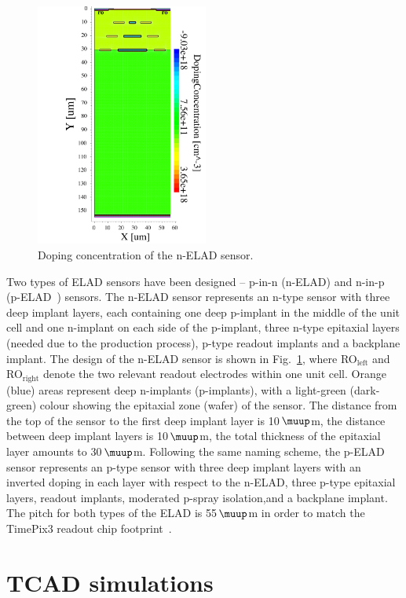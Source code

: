 \documentclass[a4paper,11pt]{article}
\begin{document}
\begin{figure}[t]
  \centering
  \includegraphics[height=8cm]{figures/nelad2.pdf}
  \caption{Doping concentration of the n-ELAD sensor.}
  \label{fig:geom}
\end{figure}

Two types of ELAD sensors have been designed -- p-in-n (n-ELAD) and n-in-p (p-ELAD~\cite{elad}) sensors.
The n-ELAD sensor represents an n-type sensor with three deep implant layers, each containing one deep p-implant in the middle of the unit cell and one n-implant on each side of the p-implant,
 three n-type epitaxial layers (needed due to the production process), p-type readout implants and a backplane implant.
The design of the n-ELAD sensor is shown in Fig.~\ref{fig:geom}, where RO$_{\textrm{left}}$ and RO$_{\textrm{right}}$ denote the two relevant readout electrodes within one unit cell.
Orange (blue) areas represent deep n-implants (p-implants), with a light-green (dark-green) colour showing the epitaxial zone (wafer) of the sensor. 
The distance from the top of the sensor to the first deep implant layer is 10\,$\muup$m, the distance between deep implant layers is 10\,$\muup$m, the total thickness of the epitaxial layer amounts to 30\,$\muup$m.
Following the same naming scheme, the p-ELAD sensor represents an p-type sensor with three deep implant layers with an inverted doping in each layer with respect to the n-ELAD, three p-type epitaxial layers,
 readout implants, moderated p-spray isolation,and a backplane implant.
The pitch for both types of the ELAD is 55\,$\muup$m in order to match the TimePix3 readout chip footprint~\cite{tp3}. 
 

\section{TCAD simulations}
\label{sec:sim}
\end{document}

